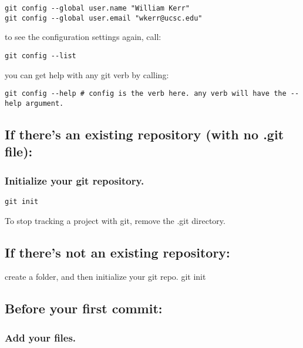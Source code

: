 \begin{verbatim}
git config --global user.name "William Kerr"
git config --global user.email "wkerr@ucsc.edu"
\end{verbatim}

to see the configuration settings again, call:

\begin{verbatim}
git config --list
\end{verbatim}

you can get help with any git verb by calling:

\begin{verbatim}
git config --help # config is the verb here. any verb will have the --help argument.
\end{verbatim}

\subsection{If there's an existing repository (with no .git
file):}\label{if-theres-an-existing-repository-with-no-.git-file}

\subsubsection{Initialize your git
repository.}\label{initialize-your-git-repository.}

\begin{verbatim}
git init
\end{verbatim}

To stop tracking a project with git, remove the .git directory.

\subsection{If there's not an existing
repository:}\label{if-theres-not-an-existing-repository}

create a folder, and then initialize your git repo. git init

\subsection{Before your first commit:}\label{before-your-first-commit}

\subsubsection{Add your files.}\label{add-your-files.}

